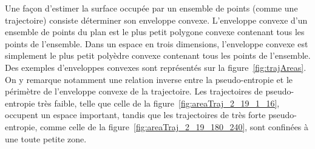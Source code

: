 	Une façon d'estimer la surface occupée par un ensemble de points (comme une trajectoire) consiste déterminer son enveloppe convexe. L'enveloppe convexe d'un ensemble de points du plan est le plus petit polygone convexe contenant tous les points de l'ensemble. Dans un espace en trois dimensions, l'enveloppe convexe est simplement le plus petit polyèdre convexe contenant tous les points de l'ensemble. Des exemples d'enveloppes convexes sont représentés sur la figure~\ref{fig:trajAreas}. On y remarque notamment une relation inverse entre la pseudo-entropie et le périmètre de l'enveloppe convexe de la trajectoire. Les trajectoires de pseudo-entropie très faible, telle que celle de la figure~\ref{fig:areaTraj_2_19_1_16}, occupent un espace important, tandis que les trajectoires de très forte pseudo-entropie, comme celle de la figure~\ref{fig:areaTraj_2_19_180_240}, sont confinées à une toute petite zone.
	
